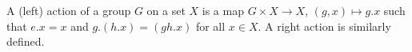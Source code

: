 A (left) action of a group  $ G $  on a set  $ X $  is a map
 $ G \times X \to X $,  $ (g,x) \mapsto g.x $  such that  $ e.x=x $  and
 $ g.(h.x)=(gh.x) $  for all  $ x \in X $.  A right action is similarly
defined.